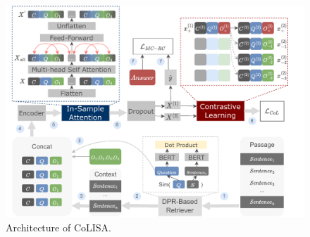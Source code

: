 \begin{figure}
    \centering
    \includegraphics [width=1.0\textwidth] {figure/4-1.pdf}
    \caption{Architecture of CoLISA.} %
    \label{fig:4-1}
\end{figure}
